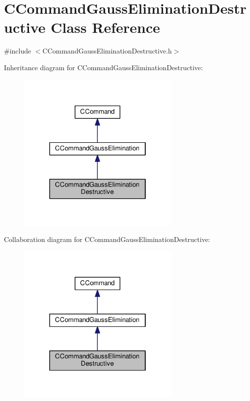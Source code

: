 \hypertarget{classCCommandGaussEliminationDestructive}{}\section{C\+Command\+Gauss\+Elimination\+Destructive Class Reference}
\label{classCCommandGaussEliminationDestructive}


{\ttfamily \#include $<$C\+Command\+Gauss\+Elimination\+Destructive.\+h$>$}



Inheritance diagram for C\+Command\+Gauss\+Elimination\+Destructive\+:
\nopagebreak
\begin{figure}[H]
\begin{center}
\leavevmode
\includegraphics[width=226pt]{classCCommandGaussEliminationDestructive__inherit__graph}
\end{center}
\end{figure}


Collaboration diagram for C\+Command\+Gauss\+Elimination\+Destructive\+:
\nopagebreak
\begin{figure}[H]
\begin{center}
\leavevmode
\includegraphics[width=226pt]{classCCommandGaussEliminationDestructive__coll__graph}
\end{center}
\end{figure}
